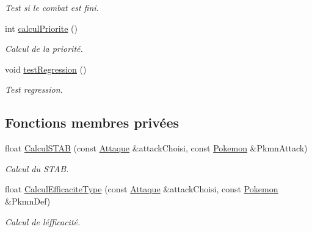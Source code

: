 \begin{DoxyCompactItemize}
\begin{DoxyCompactList}\small\item\em Test si le combat est fini. \end{DoxyCompactList}\item 
int \hyperlink{class_combat_ad1fb106750152c5008a04efc5b2b432d}{calcul\+Priorite} ()
\begin{DoxyCompactList}\small\item\em Calcul de la priorité. \end{DoxyCompactList}\item 
\mbox{\label{class_combat_ab8ad53e804e2dccddf100af63d5892e6}} 
void \hyperlink{class_combat_ab8ad53e804e2dccddf100af63d5892e6}{test\+Regression} ()
\begin{DoxyCompactList}\small\item\em Test regression. \end{DoxyCompactList}\end{DoxyCompactItemize}
\subsection*{Fonctions membres privées}
\begin{DoxyCompactItemize}
\item 
float \hyperlink{class_combat_a08f55247e72fa775222b4f0dcc210f23}{Calcul\+S\+T\+AB} (const \hyperlink{class_attaque}{Attaque} \&attack\+Choisi, const \hyperlink{class_pokemon}{Pokemon} \&Pkmn\+Attack)
\begin{DoxyCompactList}\small\item\em Calcul du S\+T\+AB. \end{DoxyCompactList}\item 
float \hyperlink{class_combat_a0bd1f896d7e1667fd5ea86658d30d2c9}{Calcul\+Efficacite\+Type} (const \hyperlink{class_attaque}{Attaque} \&attack\+Choisi, const \hyperlink{class_pokemon}{Pokemon} \&Pkmn\+Def)
\begin{DoxyCompactList}\small\item\em Calcul de l\textquotesingle{}éfficacité. \end{DoxyCompactList}\end{DoxyCompactItemize}
